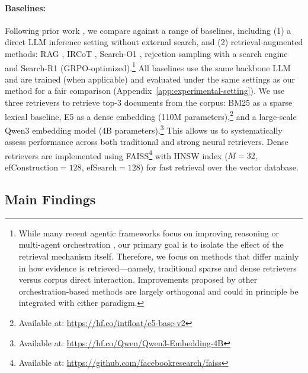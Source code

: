 \documentclass{article} %
\begin{document}
\paragraph{Baselines:}

Following prior work \citep{search-r1}, we compare against a range of baselines, including (1) a direct LLM inference setting without external search, and (2) retrieval-augmented methods: RAG \citep{rag}, IRCoT \citep{ircot}, Search-O1 \citep{search-o1}, rejection sampling with a search engine and Search-R1 \citep{search-r1} (GRPO-optimized).\footnote{While many recent agentic frameworks focus on improving reasoning\citep{jin2026beneficialreasoningbehaviorsagentic, sun-etal-2025-simpledeepsearcher} or multi-agent orchestration \citep{chen2026monolithicarchitecturesmultiagentsearch}, our primary goal is to isolate the effect of the retrieval mechanism itself. Therefore, we focus on methods that differ mainly in how evidence is retrieved---namely, traditional sparse and dense retrievers versus corpus direct interaction. Improvements proposed by other orchestration-based methods are largely orthogonal and could in principle be integrated with either paradigm.} All baselines use the same backbone LLM and are trained (when applicable) and evaluated under the same settings as our method for a fair comparison (Appendix~\ref{app:experimental-setting}). We use three retrievers to retrieve top-3 documents from the corpus: BM25 \citep{bm25} as a sparse lexical baseline, E5 \citep{e5} as a dense embedding (110M parameters),\footnote{Available at: \url{https://hf.co/intfloat/e5-base-v2}} and a large-scale Qwen3 embedding model \citep{qwen3embedding} (4B parameters).\footnote{Available at: \url{https://hf.co/Qwen/Qwen3-Embedding-4B}} This allows us to systematically assess performance across both traditional and strong neural retrievers. Dense retrievers are implemented using FAISS\footnote{Available at: \url{https://github.com/facebookresearch/faiss}} \citep{douze2025faisslibrary} with HNSW index \citep{hnsw} ($M=32$, $\text{efConstruction}=128$, $\text{efSearch}=128$) for fast retrieval over the vector database.



\subsection{Main Findings}
\end{document}
